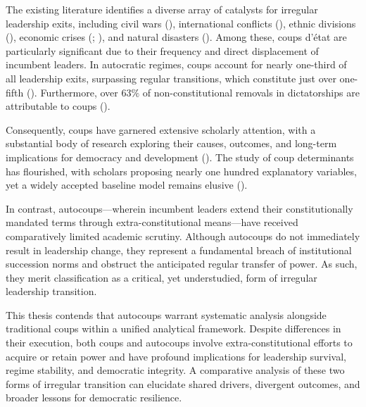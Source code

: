 \documentclass[
  12pt,
]{report}
\begin{document}
The existing literature identifies a diverse array of catalysts for
irregular leadership exits, including civil wars
(), international
conflicts (),
ethnic divisions (), economic crises (; ), and natural
disasters (). Among these, coups d'état are particularly significant due to
their frequency and direct displacement of incumbent leaders. In
autocratic regimes, coups account for nearly one-third of all leadership
exits, surpassing regular transitions, which constitute just over
one-fifth ().
Furthermore, over \(63\%\) of non-constitutional removals in
dictatorships are attributable to coups
().

Consequently, coups have garnered extensive scholarly attention, with a
substantial body of research exploring their causes, outcomes, and
long-term implications for democracy and development
(). The study of coup
determinants has flourished, with scholars proposing nearly one hundred
explanatory variables, yet a widely accepted baseline model remains
elusive ().

In contrast, autocoups---wherein incumbent leaders extend their
constitutionally mandated terms through extra-constitutional
means---have received comparatively limited academic scrutiny. Although
autocoups do not immediately result in leadership change, they represent
a fundamental breach of institutional succession norms and obstruct the
anticipated regular transfer of power. As such, they merit
classification as a critical, yet understudied, form of irregular
leadership transition.

This thesis contends that autocoups warrant systematic analysis
alongside traditional coups within a unified analytical framework.
Despite differences in their execution, both coups and autocoups involve
extra-constitutional efforts to acquire or retain power and have
profound implications for leadership survival, regime stability, and
democratic integrity. A comparative analysis of these two forms of
irregular transition can elucidate shared drivers, divergent outcomes,
and broader lessons for democratic resilience.
\end{document}
